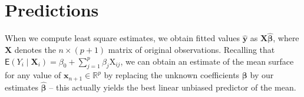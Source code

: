 \documentclass[
  11pt,
  letterpaper,
]{book}
\theoremstyle{definition}
\theoremstyle{definition}
\theoremstyle{definition}
\theoremstyle{remark}
\begin{document}
\hypertarget{predictions-lm}{%
\section{Predictions}\label{predictions-lm}}

When we compute least square estimates, we obtain fitted values \(\widehat{\boldsymbol{y}}\) as \(\mathbf{X}\widehat{\boldsymbol{\beta}}\), where \(\mathbf{X}\) denotes the \(n \times (p+1)\) matrix of original observations. Recalling that \(\mathsf{E}(Y_i \mid \mathbf{X}_i) = \beta_0 + \sum_{j=1}^p \beta_j \mathrm{X}_{ij}\), we can obtain an estimate of the mean surface for any value of \(\mathbf{x}_{n+1} \in \mathbb{R}^p\) by replacing the unknown coefficients \(\boldsymbol{\beta}\) by our estimates \(\widehat{\boldsymbol{\beta}}\) -- this actually yields the best linear unbiased predictor of the mean.
\end{document}

